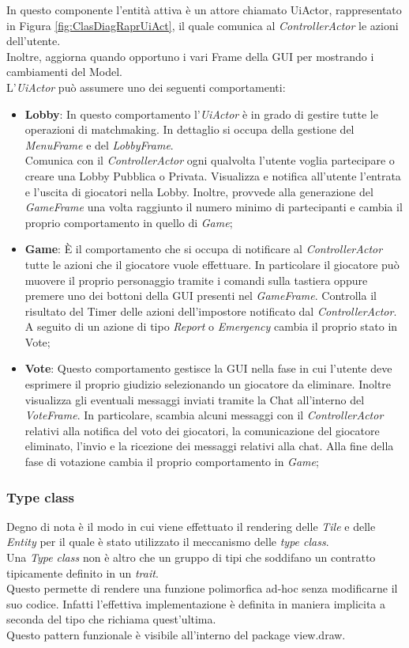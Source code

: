 In questo componente l'entit\`a attiva \`e un attore chiamato UiActor, rappresentato in Figura \ref{fig:ClasDiagRaprUiAct}, il quale comunica al \textit{ControllerActor} le azioni dell'utente.\\
Inoltre, aggiorna quando opportuno i vari Frame della GUI per mostrando i cambiamenti del Model.\\
L'\textit{UiActor} pu\`o assumere uno dei seguenti comportamenti:
\begin{itemize}
    \item \textbf{Lobby}: In questo comportamento l'\textit{UiActor} è in grado di gestire tutte le operazioni di matchmaking. In dettaglio si occupa della gestione del \textit{MenuFrame} e del \textit{LobbyFrame}.\\
    Comunica con il \textit{ControllerActor} ogni qualvolta l'utente voglia partecipare o creare una Lobby Pubblica o Privata. Visualizza e notifica all'utente l'entrata e l'uscita di giocatori nella Lobby. Inoltre, provvede alla generazione del \textit{GameFrame} una volta raggiunto il numero minimo di partecipanti e cambia il proprio comportamento in quello di \textit{Game};
    \item \textbf{Game}: \`E il comportamento che si occupa di notificare al \textit{ControllerActor} tutte le azioni che il giocatore vuole effettuare. In particolare il giocatore pu\`o muovere il proprio personaggio tramite i comandi sulla tastiera oppure premere uno dei bottoni della GUI presenti nel \textit{GameFrame}. Controlla il risultato del Timer delle azioni dell'impostore notificato dal \textit{ControllerActor}. A seguito di un azione di tipo \textit{Report} o \textit{Emergency} cambia il proprio stato in Vote;
    \item \textbf{Vote}: Questo comportamento gestisce la GUI nella fase in cui l'utente deve esprimere il proprio giudizio selezionando un giocatore da eliminare. Inoltre visualizza gli eventuali messaggi inviati tramite la Chat all'interno del \textit{VoteFrame}. In particolare, scambia alcuni messaggi con il \textit{ControllerActor} relativi alla notifica del voto dei giocatori, la comunicazione del giocatore eliminato, l'invio e la ricezione dei messaggi relativi alla chat. Alla fine della fase di votazione cambia il proprio comportamento in \textit{Game};
\end{itemize}

\subsubsection{Type class}
Degno di nota \`e il modo in cui viene effettuato il rendering delle \textit{Tile} e delle \textit{Entity} per il quale \`e stato utilizzato il meccanismo delle \textit{type class}.\\
Una \textit{Type class} non \`e altro che un gruppo di tipi che soddifano un contratto tipicamente definito in un \textit{trait}.\\
Questo permette di rendere una funzione polimorfica ad-hoc senza modificarne il suo codice. Infatti l'effettiva implementazione \`e definita in maniera implicita a seconda del tipo che richiama quest'ultima.\\
Questo pattern funzionale \`e visibile all'interno del package view.draw.

